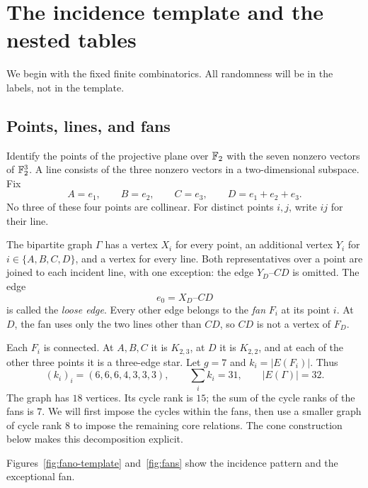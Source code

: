 \section{The incidence template and the nested tables}\label{sec:model}
We begin with the fixed finite combinatorics. All randomness will be in the labels, not in the template.

\subsection{Points, lines, and fans}
\begin{definition}\label{def:template}
Identify the points of the projective plane over $\mathbb F_2$ with the seven nonzero vectors of $\mathbb F_2^3$. A line consists of the three nonzero vectors in a two-dimensional subspace. Fix
\[
 A=e_1,\qquad B=e_2,\qquad C=e_3,\qquad D=e_1+e_2+e_3.
\]
No three of these four points are collinear. For distinct points $i,j$, write $ij$ for their line.

The bipartite graph $\Gamma$ has a vertex $X_i$ for every point, an additional vertex $Y_i$ for $i\in\{A,B,C,D\}$, and a vertex for every line. Both representatives over a point are joined to each incident line, with one exception: the edge $Y_D$--$CD$ is omitted. The edge
\[
 e_0=X_D\text{--}CD
\]
is called the \emph{loose edge}. Every other edge belongs to the \emph{fan} $F_i$ at its point $i$. At $D$, the fan uses only the two lines other than $CD$, so $CD$ is not a vertex of $F_D$.
\end{definition}

Each $F_i$ is connected. At $A,B,C$ it is $K_{2,3}$, at $D$ it is $K_{2,2}$, and at each of the other three points it is a three-edge star. Let $g=7$ and $k_i=|E(F_i)|$. Thus
\begin{equation}\label{eq:model-counts}
 (k_i)_i=(6,6,6,4,3,3,3),\qquad
 \sum_i k_i=31,\qquad |E(\Gamma)|=32.
\end{equation}
The graph has $18$ vertices. Its cycle rank is $15$; the sum of the
cycle ranks of the fans is $7$. We will first impose the cycles within
the fans, then use a smaller graph of cycle rank $8$ to impose the
remaining core relations. The cone construction below makes this
decomposition explicit.

Figures~\ref{fig:fano-template} and~\ref{fig:fans} show the incidence
pattern and the exceptional fan.




